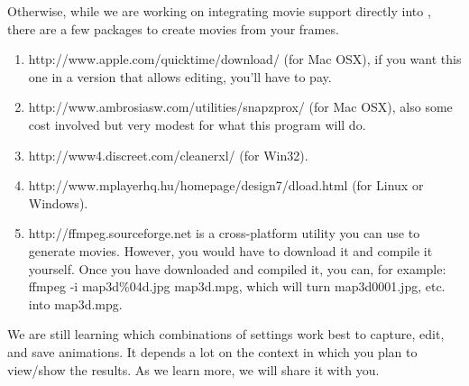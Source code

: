 Otherwise, while we are working on integrating movie support directly into
\map{}, there are a few packages to create movies from your frames.
%
\begin{enumerate}
  \item {}
    {http://www.apple.com/quicktime/download/} (for Mac OSX), if you
    want this one in a version that allows editing, you'll have to pay.
  \item {}
    {http://www.ambrosiasw.com/utilities/snapzprox/} (for Mac OSX), 
    also some cost involved but very modest for what this program will do. 
  \item {}
    {http://www4.discreet.com/cleanerxl/} 
    (for Win32). 
  \item {}
    {http://www.mplayerhq.hu/homepage/design7/dload.html} (for Linux or
    Windows).   
  \item {} {http://ffmpeg.sourceforge.net} is a 
    cross-platform utility you can use to generate movies.
    However, you would have to download it and compile it yourself.
    Once you have downloaded and compiled it, you can, for example: 
    ffmpeg -i map3d\%04d.jpg map3d.mpg, which will turn map3d0001.jpg, etc.
    into map3d.mpg.
\end{enumerate}

We are still learning which combinations of settings work best to capture,
edit, and save animations.  It depends a lot on the context in which you
plan to view/show the results.  As we learn more, we will share it with you.


